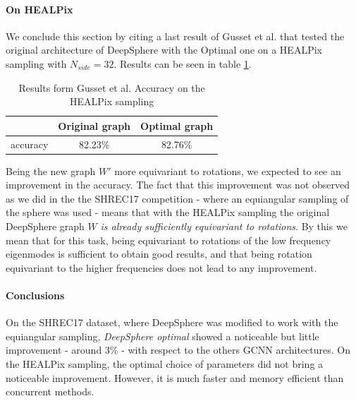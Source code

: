 \paragraph{On HEALPix }
We conclude this section by citing a last result of Gusset et al. that tested the original architecture of DeepSphere with the Optimal one on a HEALPix sampling with $N_{side}=32$. Results can be seen in table \ref{table:results}.
\begin{table}[h!]
	\centering
	\begin{tabular}{ c|c|c } 
		& Original graph & Optimal graph \\ 
		\hline
		accuracy & 82.23\% & 82.76\% \\ 
	\end{tabular}
	\caption{\label{table:results}Results form Gusset et al. Accuracy on the HEALPix sampling}
\end{table}
 Being the new graph $W'$ more equivariant to rotations, we expected to see an improvement in the accuracy. The fact that this improvement was not observed as we did in the the SHREC17 competition - where an equiangular sampling of the sphere was used - means that with the HEALPix sampling the original DeepSphere graph $W$ \textit{is already sufficiently equivariant to rotations}. By this we mean that for this task, being equivariant to rotations of the low frequency eigenmodes is sufficient to obtain good results, and that being rotation equivariant to the higher frequencies does not lead to any improvement.
 
 \paragraph{Conclusions} On the SHREC17 dataset, where DeepSphere was modified to work with the equiangular sampling, \textit{DeepSphere optimal} showed a noticeable but little improvement - around 3\% - with respect to the others GCNN architectures. On the HEALPix sampling, the optimal choice of parameters did not bring a noticeable improvement. However, it is much faster and memory efficient than concurrent methods.
